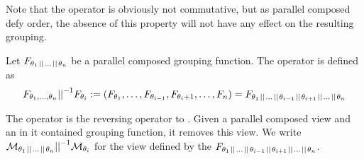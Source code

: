 \documentclass[preview]{standalone}
\begin{document}
%
%
%
Note that the operator \pll is obviously not commutative, but as parallel composed \grpfctsN defy order, the absence of this property will not have any effect on the resulting grouping.

\begin{definition}
	Let $\grpfct[\viewppty_1 \pll \dots \pll \viewppty_n]$ be a parallel composed grouping function. The operator \pllrev is defined as
	\[
	\grpfct[\viewppty_1, \dots, \viewppty_n] \pllrev \grpfct[\viewppty_i] := (\grpfct[\viewppty_1], \dots, \grpfct[\viewppty_{i-1}],\grpfct[\viewppty_i+1], \dots, \grpfct[n]) = \grpfct[\viewppty_1 \pll \dots \pll \viewppty_{i-1} \pll \viewppty_{i+1} \pll \dots \pll \viewppty_n]
	\]
\end{definition}

The operator \pllrev is the reversing operator to \pll. Given a parallel composed view and an in it contained grouping function, it removes this view. We write $\view[\viewppty_1 \pll \dots \pll \viewppty_n] \pllrev \view[\viewppty_i]$ for the view defined by the \grpfctN $\grpfct[\viewppty_1 \pll \dots \pll \viewppty_{i-1} \pll \viewppty_{i+1} \pll \dots \pll \viewppty_n]$.
\end{document}
